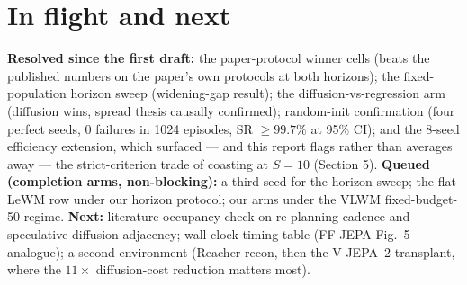 \documentclass[11pt]{article}
\begin{document}
\section{In flight and next}

\textbf{Resolved since the first draft:} the paper-protocol winner cells (beats the
published numbers on the paper's own protocols at both horizons); the
fixed-population horizon sweep (widening-gap result); the diffusion-vs-regression
arm (diffusion wins, spread thesis causally confirmed); random-init confirmation
(four perfect seeds, 0 failures in 1024 episodes, SR $\ge 99.7\%$ at 95\% CI); and
the 8-seed efficiency extension, which surfaced --- and this report flags rather
than averages away --- the strict-criterion trade of coasting at $S{=}10$
(Section 5). \textbf{Queued (completion arms, non-blocking):} a third seed for the
horizon sweep; the flat-LeWM row under our horizon protocol; our arms under the
VLWM fixed-budget-50 regime. \textbf{Next:} literature-occupancy check on
re-planning-cadence and speculative-diffusion adjacency; wall-clock timing table
(FF-JEPA Fig.~5 analogue); a second environment (Reacher recon, then the V-JEPA~2
transplant, where the $11\times$ diffusion-cost reduction matters most).
\end{document}

